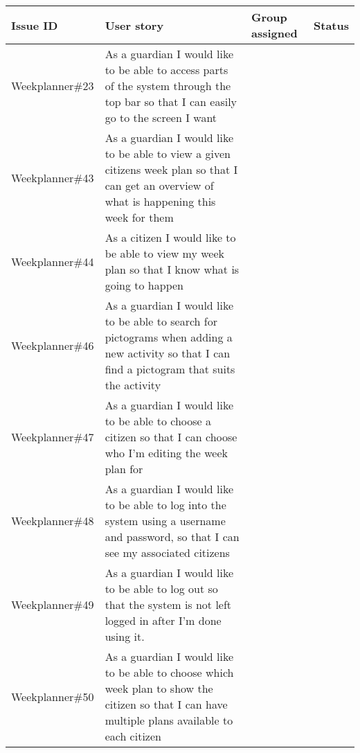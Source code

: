 \begin{table}[!ht]
    \small
    \begin{tabular}{|p{2.8cm}|p{7cm}|p{1.5cm}|p{1.5cm}|}
    \hline
    Issue ID        & User story                                                                                                                                                                          & Group assigned  & Status     \\ \hline
    Weekplanner\#23 & As a guardian I would like to be able to access parts of the system through the top bar so that I can easily go to the screen I want                                                     &                 &       \\ \hline
    Weekplanner\#43 & As a guardian I would like to be able to view a given citizens week plan so that I can get an overview of what is happening this week for them                                           &        &       \\ \hline
    Weekplanner\#44 & As a citizen I would like to be able to view my week plan so that I know what is going to happen                                                                                         &         &      \\ \hline
    Weekplanner\#46 & As a guardian I would like to be able to search for pictograms when adding a new activity so that I can find a pictogram that suits the activity                                         &         &    \\ \hline
    Weekplanner\#47 & As a guardian I would like to be able to choose a citizen so that I can choose who I’m editing the week plan for                                                                         &         &    \\ \hline
    Weekplanner\#48 & As a guardian I would like to be able to log into the system using a username and password, so that I can see my associated citizens                                                     &         &    \\ \hline
    Weekplanner\#49 & As a guardian I would like to be able to log out so that the system is not left logged in after I’m done using it.                                                                       &         &      \\ \hline
    Weekplanner\#50 & As a guardian I would like to be able to choose which week plan to show the citizen so that I can have multiple plans available to each citizen                                          &         & \\ \hline

\end{tabular}
\end{table}
